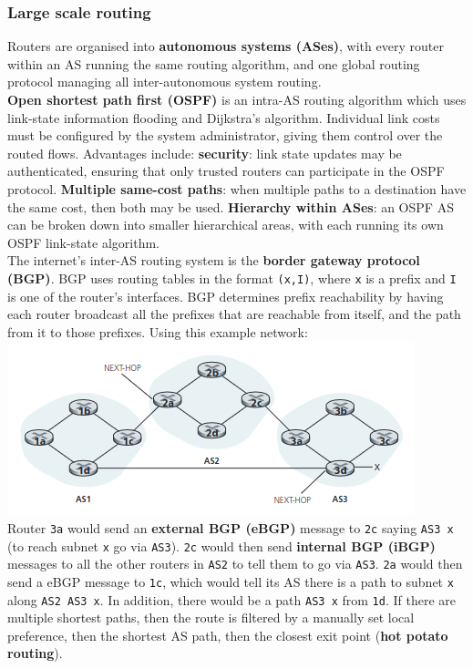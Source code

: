 \subsubsection{Large scale routing}
Routers are organised into \textbf{autonomous systems (ASes)}, with every router within an AS running the same routing algorithm, and one global routing protocol managing all inter-autonomous system routing.\\
\textbf{Open shortest path first (OSPF)} is an intra-AS routing algorithm which uses link-state information flooding and Dijkstra's algorithm. Individual link costs must be configured by the system administrator, giving them control over the routed flows. Advantages include: \textbf{security}: link state updates may be authenticated, ensuring that only trusted routers can participate in the OSPF protocol. \textbf{Multiple same-cost paths}: when multiple paths to a destination have the same cost, then both may be used. \textbf{Hierarchy within ASes}: an OSPF AS can be broken down into smaller hierarchical areas, with each running its own OSPF link-state algorithm.\\
The internet's inter-AS routing system is the \textbf{border gateway protocol (BGP)}. BGP uses routing tables in the format \verb|(x,I)|, where \verb|x| is a prefix and \verb|I| is one of the router's interfaces. BGP determines prefix reachability by having each router broadcast all the prefixes that are reachable from itself, and the path from it to those prefixes. Using this example network:
\includegraphics[width=\linewidth]{../images/w9n2bgpExampleNetwork.png}\\
Router \verb|3a| would send an \textbf{external BGP (eBGP)} message to \verb|2c| saying \verb|AS3 x| (to reach subnet \verb|x| go via \verb|AS3|). \verb|2c| would then send \textbf{internal BGP (iBGP)} messages to all the other routers in \verb|AS2| to tell them to go via \verb|AS3|. \verb|2a| would then send a eBGP message to \verb|1c|, which would tell its AS there is a path to subnet \verb|x| along \verb|AS2 AS3 x|. In addition, there would be a path \verb|AS3 x| from \verb|1d|. If there are multiple shortest paths, then the route is filtered by a manually set local preference, then the shortest AS path, then the closest exit point (\textbf{hot potato routing}).\\
